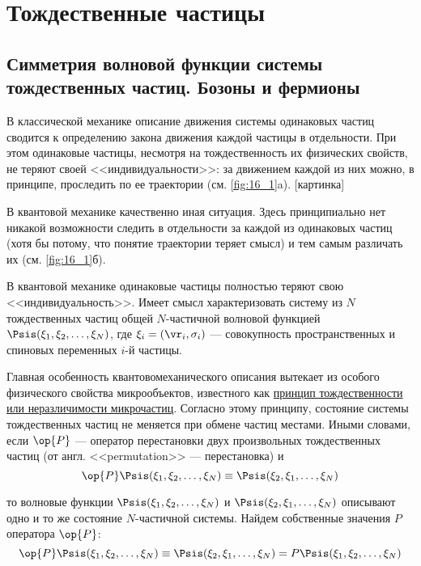 \chapter{Тождественные частицы}

\begin{sloppypar}
\section{Симметрия волновой функции системы тождественных частиц. Бозоны и фермионы}
\end{sloppypar}

В классической механике описание движения системы одинаковых частиц сводится к определению закона движения каждой частицы в отдельности. При этом одинаковые частицы, несмотря на тождественность их физических свойств, не теряют своей <<индивидуальности>>: за движением каждой из них можно, в принципе, проследить по ее траектории (см. \autoref{fig:16_1}a).
[картинка]

В квантовой механике качественно иная ситуация. Здесь принципиально нет никакой возможности следить в отдельности за каждой из одинаковых частиц (хотя бы потому, что понятие траектории теряет смысл) и тем самым различать их (см. \autoref{fig:16_1}б).

В квантовой механике одинаковые частицы полностью теряют свою <<индивидуальность>>. Имеет смысл характеризовать систему из $N$ тождественных частиц общей $N$-частичной волновой функцией $\Psis(\xi_1, \xi_2, \dots, \xi_N )$, где $\xi_i = (\vr_i, \sigma_i)$ --- совокупность пространственных и спиновых переменных $i$-й частицы.

Главная особенность квантовомеханического описания вытекает из особого физического свойства микрообъектов, известного как \underline{принцип тождественности или неразличимости микрочастиц}. Согласно этому принципу, состояние системы тождественных частиц не меняется при обмене частиц местами. Иными словами, если $\op{P}$ --- оператор перестановки двух произвольных тождественных частиц (от англ. <<permutation>> --- перестановка) и
$$
\op{P} \Psis(\xi_1, \xi_2, \dots, \xi_N) \equiv \Psis(\xi_2, \xi_1, \dots, \xi_N)
$$

то волновые функции $\Psis(\xi_1, \xi_2, \dots, \xi_N)$ и $\Psis(\xi_2, \xi_1, \dots, \xi_N)$ описывают одно и то же состояние $N$-частичной системы. Найдем собственные значения $P$ оператора $\op{P}$:
\begin{equation}
\label{eq:16_1_1}
\op{P} \Psis(\xi_1, \xi_2, \dots, \xi_N) \equiv \Psis(\xi_2, \xi_1, \dots, \xi_N) = P \Psis(\xi_1, \xi_2, \dots, \xi_N)
\end{equation}

